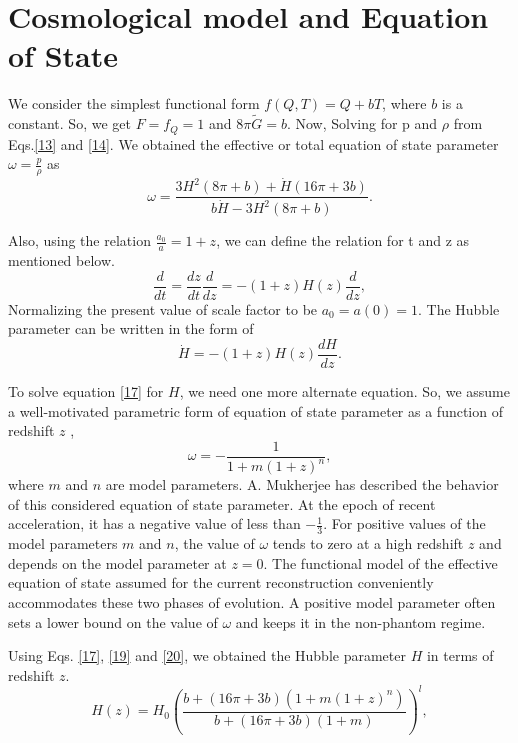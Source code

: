 \section{Cosmological model and Equation of State}\label{sec3}

We consider the simplest functional form $f(Q,T)= Q+bT$, where $b$ is a constant. So, we get $F= f_{Q}= 1$ and $8\pi \widetilde{G}= b$.
Now, Solving for p and $\rho$ from Eqs.\eqref{13} and \eqref{14}. We obtained the effective or total equation of state parameter $\omega= \frac{p}{\rho}$ as
\begin{equation}
\label{17}
\omega= \frac{3 H^{2}(8\pi + b)+ \dot{H}(16 \pi+ 3b)}{ b \dot{H} - 3 H^{2}(8\pi+ b)}.
\end{equation}

Also, using the relation $\frac{a_{0}}{a}= 1+z$, we can define the relation for t and z as mentioned below.
\begin{equation}
\label{18}
\frac{d}{dt}= \frac{dz}{dt}\frac{d}{dz}= -(1+z) H(z)\frac{d}{dz},
\end{equation}
Normalizing the present value of scale factor to be $a_{0}= a(0)=1$. The Hubble parameter can be written in the form of 
\begin{equation}
\label{19}
\dot{H}= -(1+z) H(z)\frac{dH}{dz}.
\end{equation}

To solve equation \eqref{17} for $H$, we need one more alternate equation. So, we assume a well-motivated parametric form of equation of state parameter as a function of redshift $z$ \cite{Ankan/2016}, 
\begin{equation}
\label{20}
\omega= -\frac{1}{1+ m(1+z)^{n}},
\end{equation}
where $m$ and $n$ are model parameters. A. Mukherjee \cite{Ankan/2016} has described the behavior of this considered equation of state parameter. At the epoch of recent acceleration, it has a negative value of less than $-\frac{1}{3}$. For positive values of the model parameters $m$ and $n$, the value of $\omega$ tends to zero at a high redshift $z$ and depends on the model parameter at $z = 0$. The functional model of the effective equation of state assumed for the current reconstruction conveniently accommodates these two phases of evolution. A positive model parameter often sets a lower bound on the value of $\omega$ and keeps it in the non-phantom regime.

Using Eqs. \eqref{17}, \eqref{19} and \eqref{20}, we obtained the Hubble parameter $H$ in terms of redshift $z$.
\begin{equation}\label{21}
H(z)= H_{0} \left( \frac{b+(16\pi+ 3b)(1+m(1+z)^{n})}{b+(16\pi+3b)(1+m)}\right) ^{l},
\end{equation}

